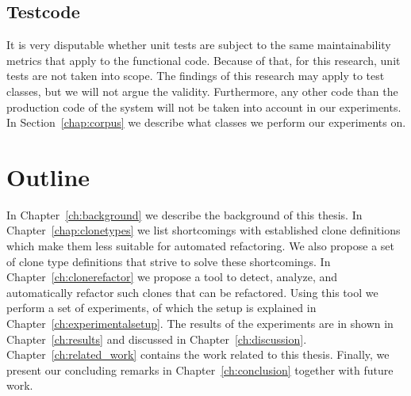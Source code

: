 \subsection{Testcode}
It is very disputable whether unit tests are subject to the same maintainability metrics that apply to the functional code. Because of that, for this research, unit tests are not taken into scope. The findings of this research may apply to test classes, but we will not argue the validity. Furthermore, any other code than the production code of the system will not be taken into account in our experiments. In Section~\ref{chap:corpus} we describe what classes we perform our experiments on.

\section{Outline}
In Chapter~\ref{ch:background} we describe the background of this thesis. In Chapter~\ref{chap:clonetypes} we list shortcomings with established clone definitions which make them less suitable for automated refactoring. We also propose a set of clone type definitions that strive to solve these shortcomings. In Chapter~\ref{ch:clonerefactor} we propose a tool to detect, analyze, and automatically refactor such clones that can be refactored. Using this tool we perform a set of experiments, of which the setup is explained in Chapter~\ref{ch:experimentalsetup}. The results of the experiments are in shown in Chapter~\ref{ch:results} and discussed in Chapter~\ref{ch:discussion}. Chapter~\ref{ch:related_work} contains the work related to this thesis. Finally, we present our concluding remarks in Chapter~\ref{ch:conclusion} together with future work.

